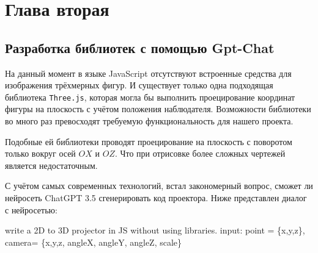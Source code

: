 \section{Глава вторая}\label{2sect}
\subsection{Разработка библиотек с помощью Gpt-Chat}

На данный момент в языке JavaScript отсутствуют встроенные средства для изображения трёхмерных фигур. И существует только одна подходящая библиотека \texttt{Three.js}, которая могла бы выполнить проецирование координат фигуры на плоскость с учётом положения наблюдателя. Возможности библиотеки во много раз превосходят требуемую функциональность для нашего проекта.

Подобные ей библиотеки проводят проецирование на плоскость с поворотом только вокруг осей $OX$ и $OZ$. Что при отрисовке более сложных чертежей является недостаточным.

С учётом самых современных технологий, встал закономерный вопрос, сможет ли нейросеть ChatGPT 3.5 сгенерировать код проектора. Ниже представлен диалог с нейросетью:

\begin{leftBox}
	write a 2D to 3D projector in JS without using libraries. input:  point = \{x,y,z\}, camera= \{x,y,z, angleX, angleY, angleZ, scale\}
\end{leftBox}

